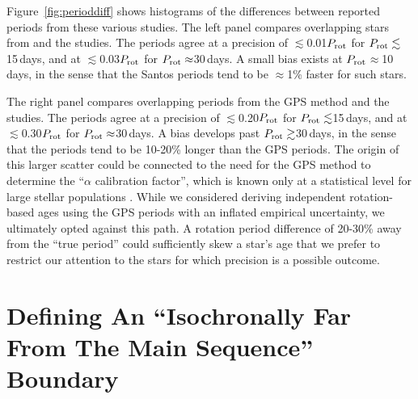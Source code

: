 \documentclass[11pt,twocolumn,tighten]{aastex63}
\begin{document}
Figure~\ref{fig:perioddiff} shows histograms of the differences
between reported periods from these various studies.  The left panel
compares overlapping stars from \citet{McQuillan_2014} and
the \citeauthor{Santos_2021} studies.  The periods agree at a precision of
$\lesssim$0.01$P_{\rm rot}$ for $P_{\rm rot}\lesssim$15\,days, and at
$\lesssim$0.03$P_{\rm rot}$ for $P_{\rm rot}\approx$30\,days.  
A small bias exists at $P_{\rm rot}$$\approx$10\,days,
in the sense that the Santos periods tend to be $\approx$1\% faster
for such stars.

The right panel compares overlapping periods from the
\citet{Reinhold2023} GPS method and the \citeauthor{Santos_2021} studies.  The
periods agree at a precision of $\lesssim$0.20$P_{\rm rot}$ for
$P_{\rm rot}\lesssim$15\,days, and at $\lesssim$0.30$P_{\rm rot}$ for
$P_{\rm rot}\approx$30\,days.  A  bias develops past $P_{\rm
rot}\gtrsim$30\,days, in the sense that the \citeauthor{Santos_2021}
periods tend to be 10-20\% longer than the GPS periods.  The origin of
this larger scatter could be connected to the need for the GPS method
to determine the ``$\alpha$ calibration factor'', which is known only
at a statistical level for large stellar populations
\citep[see][]{Reinhold2023}.  While we considered deriving independent
rotation-based ages using the \citet{Reinhold2023} GPS periods with an
inflated empirical uncertainty, we ultimately opted against this path.
A rotation period difference of 20-30\% away from the ``true period''
could sufficiently skew a star's age that we prefer to restrict our
attention to the stars for which precision is a possible
outcome.





\section{Defining An ``Isochronally Far From The Main Sequence'' Boundary}
\label{app:linemethod}
\end{document}
